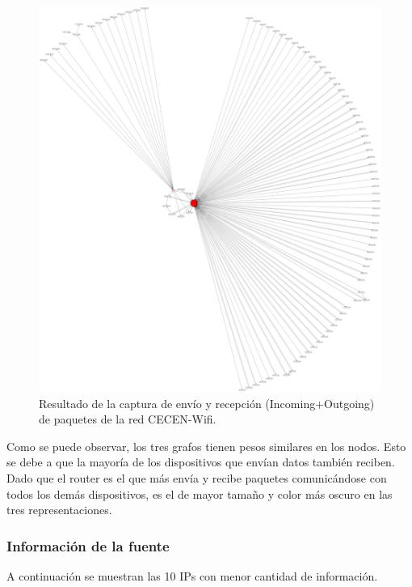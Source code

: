 \documentclass[10pt, a4paper]{article}
\begin{document}
\begin{figure}[H] %
\begin{center}
\includegraphics[width=450pt]{../imgs/cecen-entero.png}
\caption{Resultado de la captura de envío y recepción (Incoming+Outgoing) de paquetes de la red CECEN-Wifi.}
\end{center}
\end{figure}

Como se puede observar, los tres grafos tienen pesos similares en los nodos. Esto se debe a que la mayoría de los dispositivos que envían datos también reciben. Dado que el router es el que más envía y recibe paquetes comunicándose con todos los demás dispositivos, es el de mayor tamaño y color más oscuro en las tres representaciones.

\newpage
\subsubsection{Información de la fuente}

A continuación se muestran las 10 IPs con menor cantidad de información.
\end{document}
